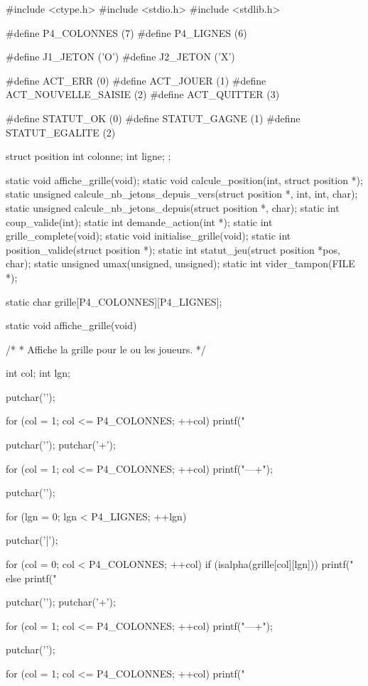 \begin{C}
#include <ctype.h>
#include <stdio.h>
#include <stdlib.h>

#define P4_COLONNES (7)
#define P4_LIGNES (6)

#define J1_JETON ('O')
#define J2_JETON ('X')

#define ACT_ERR (0)
#define ACT_JOUER (1)
#define ACT_NOUVELLE_SAISIE (2)
#define ACT_QUITTER (3)

#define STATUT_OK (0)
#define STATUT_GAGNE (1)
#define STATUT_EGALITE (2)

struct position
{
    int colonne;
    int ligne;
};

static void affiche_grille(void);
static void calcule_position(int, struct position *);
static unsigned calcule_nb_jetons_depuis_vers(struct position *, int, int, char);
static unsigned calcule_nb_jetons_depuis(struct position *, char);
static int coup_valide(int);
static int demande_action(int *);
static int grille_complete(void);
static void initialise_grille(void);
static int position_valide(struct position *);
static int statut_jeu(struct position *pos, char);
static unsigned umax(unsigned, unsigned);
static int vider_tampon(FILE *);

static char grille[P4_COLONNES][P4_LIGNES];


static void affiche_grille(void)
{
    /*
     * Affiche la grille pour le ou les joueurs.
     */

    int col;
    int lgn;

    putchar('\n');

    for (col = 1; col <= P4_COLONNES; ++col)
        printf("  %

    putchar('\n');
    putchar('+');

    for (col = 1; col <= P4_COLONNES; ++col)
        printf("---+");

    putchar('\n');

    for (lgn = 0; lgn < P4_LIGNES; ++lgn)
    {
        putchar('|');

        for (col = 0; col < P4_COLONNES; ++col)
            if (isalpha(grille[col][lgn]))
                printf(" %
            else
                printf(" %

        putchar('\n');
        putchar('+');

        for (col = 1; col <= P4_COLONNES; ++col)
            printf("---+");

        putchar('\n');
    }

    for (col = 1; col <= P4_COLONNES; ++col)
        printf("  %

}
\end{C}
